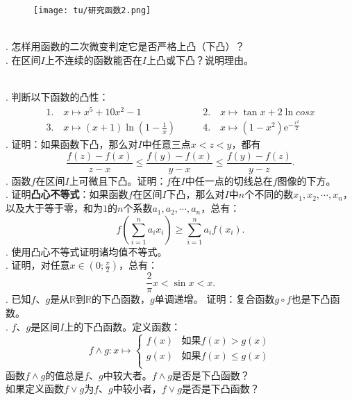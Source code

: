 \documentclass[12pt,UTF8]{ctexbook}
\begin{document}
\begin{figure}[H]
    \centering
    \texttt{[image: tu/研究函数2.png]}
\end{figure}


\begin{sk}
    \mbox{} \\
    . 怎样用函数的二次微变判定它是否严格上凸（下凸）？\\
    . 在区间$I$上不连续的函数能否在$I$上凸或下凸？说明理由。
\end{sk}

\begin{xt}
    \mbox{} \\
    . 判断以下函数的凸性：
    $$
    \begin{array}{ll}
        1. \quad x \mapsto x^5 + 10x^2 - 1 \qquad &2. \quad x \mapsto \tan{x} + 2\ln{cos{x}} \\
        3. \quad x \mapsto (x+1)\ln{\left(1 - \frac{1}{x}\right)} \qquad &4. \quad x \mapsto \left(1 - x^2\right)\mathrm{e}^{-\frac{x^2}{2}}
    \end{array}
    $$
    . 证明：如果函数下凸，那么对$I$中任意三点$x < z < y$，都有
    $$ \frac{f(z) - f(x)}{z - x} \leqslant \frac{f(y) - f(x)}{y - x}  \leqslant \frac{f(y) - f(z)}{y - z}. $$
    . 函数$f$在区间$I$上可微且下凸。证明：$f$在$I$中任一点的切线总在$f$图像的下方。\\
    . 证明\textbf{凸心不等式}：如果函数$f$在区间$I$下凸，那么对$I$中$n$个不同的数$x_1, x_2, \cdots , x_n$，
    以及大于等于零，和为$1$的$n$个系数$a_1, a_2, \cdots, a_n$，总有：
    $$ f\left(\sum_{i=1}^n a_i x_i\right) \geqslant \sum_{i=1}^n a_i f(x_i). $$
    . 使用凸心不等式证明诸均值不等式。\\
    . 证明，对任意$x\in\left(0; \frac{\pi}{2}\right)$，总有：
    $$ \frac{2}{\pi} x < \sin{x} < x.$$
    . 已知$f$、$g$是从$\mathbb{R}$到$\mathbb{R}$的下凸函数，$g$单调递增。
    证明：复合函数$g\circ f$也是下凸函数。\\
    . $f$、$g$是区间$I$上的下凸函数。定义函数：
    $$ f \wedge g : x \mapsto \left\{
        \begin{array}{cl}
            f(x) & \mbox{如果} f(x) > g(x) \\
            g(x) & \mbox{如果} f(x) \leqslant g(x) \\
        \end{array}
    \right.
    $$
    \indent 函数$f \wedge g$的值总是$f$、$g$中较大者。$f \wedge g$是否是下凸函数？\\
    \indent 如果定义函数$f \vee g$为$f$、$g$中较小者，$f \vee g$是否是下凸函数？

\end{xt}
\end{document}
